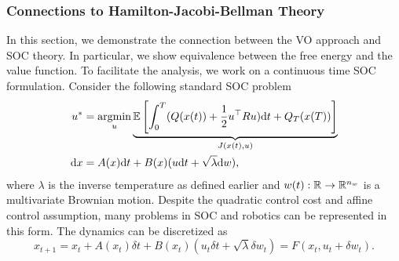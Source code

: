\documentclass[twoside,11pt]{article}
\begin{document}
\subsubsection{Connections to Hamilton-Jacobi-Bellman Theory}
\label{sec: connection_hjb}
In this section, we demonstrate the connection between the \ac{VO} approach and \ac{SOC} theory. In particular, we show equivalence between the free energy and the value function. To facilitate the analysis, we work on a continuous time \ac{SOC} formulation. Consider the following standard \ac{SOC} problem
\begin{equation}\label{eq: soc_problem}
\begin{split}
u^* &= \argmin_u \underbrace{\Eb\left[\int_0^T (Q(x(t)) + \frac{1}{2}u\T Ru)\rd t + Q_T(x(T))\right]}_{J(x(t),u)}\\
\rd x &= A(x) \rd t + B(x)(u\rd t + \sqrt{\lambda}\rd w),
\end{split}
\end{equation}
where $\lambda$ is the inverse temperature as defined earlier and $w(t):\mathbb{R}\rightarrow \mathbb{R}^{n_w}$ is a multivariate Brownian motion. Despite the quadratic control cost and affine control assumption, many problems in \ac{SOC} and robotics can be represented in this form. The dynamics can be discretized as
\begin{equation}\label{eq: discretized_dynamics}
x_{t+1} = x_t + A(x_t) \delta t + B(x_t)(u_t \delta t + \sqrt{\lambda} \delta w_t) = F(x_t, u_t + \delta w_t).
\end{equation}
\end{document}
